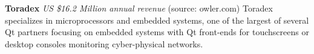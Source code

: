 \begin{frame}{}
{\begin{minipage}{\textwidth}
{\begin{enumerate}
\dmitem \textbf{Toradex} 
\textit{US \$16.2 Million annual revenue} (source: owler.com)
Toradex specializes in microprocessors 
and embedded systems, one of the largest 
of several Qt partners focusing on 
embedded systems with Qt front-ends 
for touchscreens or desktop consoles 
monitoring cyber-physical networks.


\end{enumerate}}
\end{minipage}

}

\end{frame}
